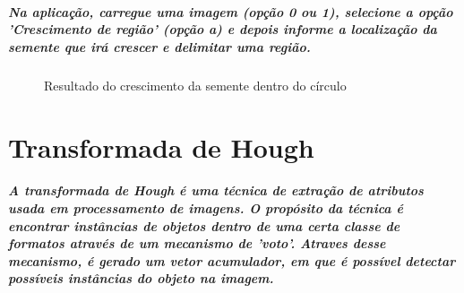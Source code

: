 \documentclass[12pt,fleqn]{article}
\begin{document}
      \subparagraph{\normalfont Na aplicação, carregue uma imagem (opção 0 ou 1), selecione a opção 'Crescimento de região' (opção a) e depois informe a localização da semente que irá crescer e delimitar uma região.
      }
     

      \newpage

      \begin{figure}[!htb]
      \centering
      \caption{Resultado do crescimento da semente dentro do círculo}
      \label{fig:Resultado 1}
      \end{figure}
      

  \section{Transformada de Hough}

      \subparagraph{\normalfont A transformada de Hough é uma técnica de extração de atributos usada em processamento de imagens. O propósito da técnica é encontrar instâncias de objetos dentro de uma certa classe de formatos através de um mecanismo de 'voto'. Atraves desse mecanismo, é gerado um vetor acumulador, em que é possível detectar possíveis instâncias do objeto na imagem.}
      
\end{document}
